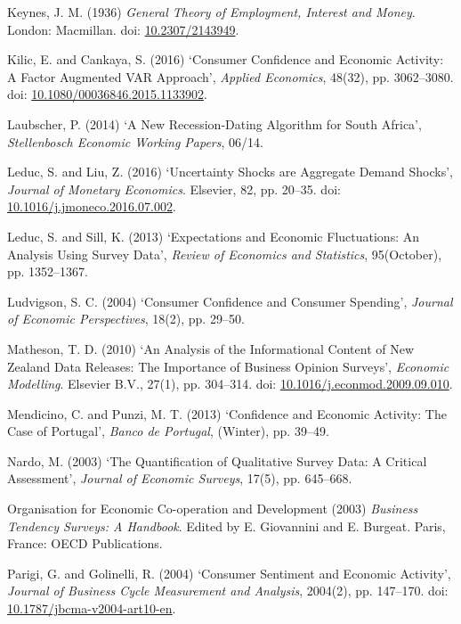 \documentclass[11pt,]{article}
\begin{document}
\hypertarget{ref-Keynes1936}{}
Keynes, J. M. (1936) \emph{General Theory of Employment, Interest and
Money}. London: Macmillan. doi:
\href{https://doi.org/10.2307/2143949}{10.2307/2143949}.

\hypertarget{ref-Kilic2016}{}
Kilic, E. and Cankaya, S. (2016) `Consumer Confidence and Economic
Activity: A Factor Augmented VAR Approach', \emph{Applied Economics},
48(32), pp. 3062--3080. doi:
\href{https://doi.org/10.1080/00036846.2015.1133902}{10.1080/00036846.2015.1133902}.

\hypertarget{ref-Laubscher2014}{}
Laubscher, P. (2014) `A New Recession-Dating Algorithm for South
Africa', \emph{Stellenbosch Economic Working Papers}, 06/14.

\hypertarget{ref-Leduc2016}{}
Leduc, S. and Liu, Z. (2016) `Uncertainty Shocks are Aggregate Demand
Shocks', \emph{Journal of Monetary Economics}. Elsevier, 82, pp. 20--35.
doi:
\href{https://doi.org/10.1016/j.jmoneco.2016.07.002}{10.1016/j.jmoneco.2016.07.002}.

\hypertarget{ref-Leduc2013}{}
Leduc, S. and Sill, K. (2013) `Expectations and Economic Fluctuations:
An Analysis Using Survey Data', \emph{Review of Economics and
Statistics}, 95(October), pp. 1352--1367.

\hypertarget{ref-Ludvigson2004}{}
Ludvigson, S. C. (2004) `Consumer Confidence and Consumer Spending',
\emph{Journal of Economic Perspectives}, 18(2), pp. 29--50.

\hypertarget{ref-Matheson2010}{}
Matheson, T. D. (2010) `An Analysis of the Informational Content of New
Zealand Data Releases: The Importance of Business Opinion Surveys',
\emph{Economic Modelling}. Elsevier B.V., 27(1), pp. 304--314. doi:
\href{https://doi.org/10.1016/j.econmod.2009.09.010}{10.1016/j.econmod.2009.09.010}.

\hypertarget{ref-Mendicino2013}{}
Mendicino, C. and Punzi, M. T. (2013) `Confidence and Economic Activity:
The Case of Portugal', \emph{Banco de Portugal}, (Winter), pp. 39--49.

\hypertarget{ref-Nardo2003}{}
Nardo, M. (2003) `The Quantification of Qualitative Survey Data: A
Critical Assessment', \emph{Journal of Economic Surveys}, 17(5), pp.
645--668.

\hypertarget{ref-OECD2003}{}
Organisation for Economic Co-operation and Development (2003)
\emph{Business Tendency Surveys: A Handbook}. Edited by E. Giovannini
and E. Burgeat. Paris, France: OECD Publications.

\hypertarget{ref-Parigi2004}{}
Parigi, G. and Golinelli, R. (2004) `Consumer Sentiment and Economic
Activity', \emph{Journal of Business Cycle Measurement and Analysis},
2004(2), pp. 147--170. doi:
\href{https://doi.org/10.1787/jbcma-v2004-art10-en}{10.1787/jbcma-v2004-art10-en}.
\end{document}
